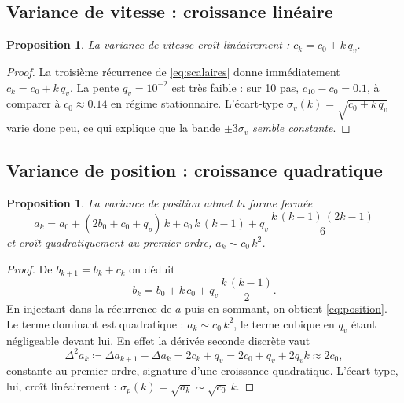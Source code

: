 \documentclass[11pt]{article}
\newtheorem{proposition}[theorem]{Proposition}
\theoremstyle{remark}
\theoremstyle{definition}
\begin{document}
\subsection{Variance de vitesse : croissance lin\'eaire}

\begin{proposition}\label{prop:vitesse}
La variance de vitesse cro\^it lin\'eairement : $c_k = c_0 + k\, q_v$.
\end{proposition}

\begin{proof}
La troisi\`eme r\'ecurrence de \eqref{eq:scalaires} donne imm\'ediatement $c_k = c_0 + k\, q_v$.
La pente $q_v = 10^{-2}$ est tr\`es faible : sur 10 pas, $c_{10} - c_0 = 0.1$, \`a comparer \`a
$c_0 \approx 0.14$ en r\'egime stationnaire. L'\'ecart-type
$\sigma_v(k) = \sqrt{c_0 + k\, q_v}$ varie donc peu, ce qui explique que la bande $\pm 3\sigma_v$
\emph{semble constante}.
\end{proof}

\subsection{Variance de position : croissance quadratique}

\begin{proposition}\label{prop:position}
La variance de position admet la forme ferm\'ee
\begin{equation}
\boxed{a_k = a_0 + (2b_0 + c_0 + q_p)\, k + c_0\, k\,(k-1) + q_v\,\frac{k\,(k-1)\,(2k-1)}{6}}
\label{eq:position}
\end{equation}
et cro\^it quadratiquement au premier ordre, $a_k \sim c_0\, k^2$.
\end{proposition}

\begin{proof}
De $b_{k+1} = b_k + c_k$ on d\'eduit
\begin{equation}
b_k = b_0 + k\, c_0 + q_v\,\frac{k\,(k-1)}{2}.
\end{equation}
En injectant dans la r\'ecurrence de $a$ puis en sommant, on obtient \eqref{eq:position}. Le terme
dominant est quadratique : $a_k \sim c_0\, k^2$, le terme cubique en $q_v$ \'etant n\'egligeable devant
lui. En effet la d\'eriv\'ee seconde discr\`ete vaut
\begin{equation}
\Delta^2 a_k \coloneqq \Delta a_{k+1} - \Delta a_k = 2 c_k + q_v = 2 c_0 + q_v + 2 q_v k \approx 2 c_0,
\end{equation}
constante au premier ordre, signature d'une croissance quadratique. L'\'ecart-type, lui, cro\^it
lin\'eairement : $\sigma_p(k) = \sqrt{a_k} \sim \sqrt{c_0}\ k$.
\end{proof}
\end{document}

